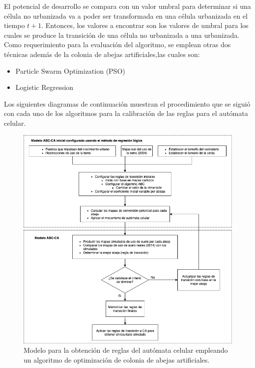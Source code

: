 El potencial de desarrollo se compara con un valor umbral para determinar si una célula no urbanizada va a poder ser transformada en una célula urbanizada en el tiempo $t+1$. Entonces, los valores a encontrar son los valores de umbral para los cuales se produce la transición de una célula no urbanizada a una urbanizada.
\\
Como requerimiento para la evaluación del algoritmo, se emplean otras dos técnicas además de la colonia de abejas artificiales,las cuales son:
\begin{itemize}
	\item Particle Swarm Optimization (PSO)
	\item Logistic Regression
\end{itemize}

Los siguientes diagramas de continuación muestran el procedimiento que se siguió con cada uno de los algoritmos para la calibración de las reglas para el autómata celular.

\begin{figure}[H]
	\centering
	\includegraphics[width=\linewidth]{fig/abejas}
	\caption{Modelo para la obtención de reglas del autómata celular empleando un algoritmo de optimización de colonia de abejas artificiales.}
	\label{fig:abc}
\end{figure}

